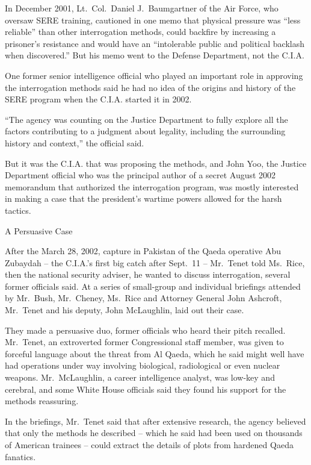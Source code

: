 \documentclass[12pt,a4paper,onecolumn]{article}
\begin{document}
In December 2001, Lt.~Col.~Daniel J.~Baumgartner of the Air Force, who oversaw SERE training,
cautioned in one memo that physical pressure was ``less reliable'' than other interrogation methods,
could backfire by increasing a prisoner's resistance and would have an ``intolerable public and
political backlash when discovered.'' But his memo went to the Defense Department, not the C.I.A.

One former senior intelligence official who played an important role in approving the interrogation
methods said he had no idea of the origins and history of the SERE program when the C.I.A. started
it in 2002.

``The agency was counting on the Justice Department to fully explore all the factors contributing to
a judgment about legality, including the surrounding history and context,'' the official said.

But it was the C.I.A. that was proposing the methods, and John Yoo, the Justice Department official
who was the principal author of a secret August 2002 memorandum that authorized the interrogation
program, was mostly interested in making a case that the president's wartime powers allowed for the
harsh tactics.

A Persuasive Case

After the March 28, 2002, capture in Pakistan of the Qaeda operative Abu Zubaydah -- the C.I.A.'s
first big catch after Sept.~11 -- Mr.~Tenet told Ms.~Rice, then the national security adviser, he
wanted to discuss interrogation, several former officials said. At a series of small-group and
individual briefings attended by Mr.~Bush, Mr.~Cheney, Ms.~Rice and Attorney General John Ashcroft,
Mr.~Tenet and his deputy, John McLaughlin, laid out their case.

They made a persuasive duo, former officials who heard their pitch recalled. Mr.~Tenet, an
extroverted former Congressional staff member, was given to forceful language about the threat from
Al Qaeda, which he said might well have had operations under way involving biological, radiological
or even nuclear weapons. Mr.~McLaughlin, a career intelligence analyst, was low-key and cerebral,
and some White House officials said they found his support for the methods reassuring.

In the briefings, Mr.~Tenet said that after extensive research, the agency believed that only the
methods he described -- which he said had been used on thousands of American trainees -- could
extract the details of plots from hardened Qaeda fanatics.
\end{document}
